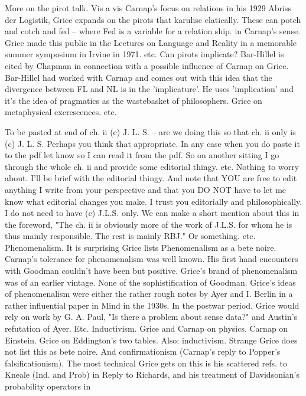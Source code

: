 \documentclass[10pt,titlepage]{book}
\begin{document}
More  on the pirot talk. Vis a vis Carnap’s focus on relations in his 1929  
Abriss der Logistik, Grice expands on the pirots that karulise elatically. 
These  can potch and cotch and fed – where Fed is a variable for a relation 
ship. in  Carnap's sense. Grice made this public in the Lectures on Language 
and Reality  in a  memorable summer symposium in Irvine in 1971. etc. 
Can  pirots implicate? Bar-Hillel  is cited by Chapman in connection with a 
possible influence of Carnap on Grice.  Bar-Hillel had worked with Carnap 
and comes out with this idea that the  divergence between FL and NL is in the 
'implicature'. He uses 'implication' and  it's the idea of pragmatics as 
the wastebasket of philosophers. Grice on  metaphysical excrescences. etc.

To  be pasted at end of ch. ii (c) J. L. S. -- are we doing this so that 
ch. ii only  is (c) J. L. S. Perhaps you think that appropriate. 
In  any case when you do paste it to the pdf let know so I can read it from 
the pdf.  So on another sitting I go through the whole ch. ii and provide 
some editorial  thingy. etc. Nothing to worry about. I'll be brief with the 
editorial  thingy. 
And  note that YOU are free to edit anything I write from your perspective 
and that  you DO NOT have to let me know what editorial changes you make. I 
trust you  editorially and philosophically. I do not need to have (c) J.L.S. 
only. We can  make a short mention about this in the foreword, "The ch. ii 
is obviously more  of the work of J.L.S. for whom he is thus mainly 
responsible. The rest is mainly  RBJ." Or something. 
etc. 
Phenomenalism.  It is surprising Grice lists Phenomenalism as a bete 
noire. Carnap's tolerance  for phenomenalism was well known. His first hand 
encounters with Goodman  couldn't have been but positive. Grice's brand of 
phenomenalism was of an  earlier vintage. None of the sophistification of 
Goodman. Grice's ideas of  phenomenalism were either the rather rough notes by Ayer 
and I. Berlin in a  rather influential paper in Mind in the 1930s. In the 
postwar period, Grice  would rely on work by G. A. Paul, "Is there a problem 
about sense data?" and  Austin's refutation of Ayer. Etc. 
Inductivism.  Grice and Carnap on physics. Carnap on Einstein. Grice on 
Eddington's two  tables. Also: 
inductivism.  Strange Grice does not list this as bete noire. And 
confirmationism (Carnap's  reply to Popper's falsificationism). The most technical 
Grice gets on this is  his scattered refs. to Kneale (Ind. and Prob) in Reply 
to Richards, and his  treatment of Davidsonian's probability operators in 
\end{document}
